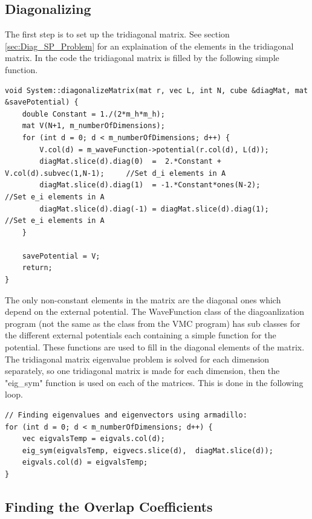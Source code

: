 \documentclass[../main.tex]{subfiles}
\begin{document}
\subsection{Diagonalizing}

The first step is to set up the tridiagonal matrix. See section \ref{sec:Diag_SP_Problem} for an explaination of the elements in the tridiagonal matrix. In the code the tridiagonal matrix is filled by the following simple function.
\lstset{language=c++}
\begin{lstlisting}[caption={}]
void System::diagonalizeMatrix(mat r, vec L, int N, cube &diagMat, mat &savePotential) {
    double Constant = 1./(2*m_h*m_h);
    mat V(N+1, m_numberOfDimensions);
    for (int d = 0; d < m_numberOfDimensions; d++) {
        V.col(d) = m_waveFunction->potential(r.col(d), L(d));
        diagMat.slice(d).diag(0)  =  2.*Constant + V.col(d).subvec(1,N-1);     //Set d_i elements in A
        diagMat.slice(d).diag(1)  = -1.*Constant*ones(N-2);               //Set e_i elements in A
        diagMat.slice(d).diag(-1) = diagMat.slice(d).diag(1);                         //Set e_i elements in A
    }

    savePotential = V;
    return;
}
\end{lstlisting}
The only non-constant elements in the matrix are the diagonal ones which depend on the external potential. The WaveFunction class of the diagoanlization program (not the same as the class from the VMC program) has sub classes for the different external potentials each containing a simple function for the potential. These functions are used to fill in the diagonal elements of the matrix. The tridiagonal matrix eigenvalue problem is solved for each dimension separately, so one tridiagonal matrix is made for each dimension, then the "eig\_sym" function is used on each of the matrices. This is done in the following loop.
\lstset{language=c++}
\begin{lstlisting}[caption={}]
// Finding eigenvalues and eigenvectors using armadillo:
for (int d = 0; d < m_numberOfDimensions; d++) {
    vec eigvalsTemp = eigvals.col(d);
    eig_sym(eigvalsTemp, eigvecs.slice(d),  diagMat.slice(d));
    eigvals.col(d) = eigvalsTemp;
}
\end{lstlisting}

\subsection{Finding the Overlap Coefficients}
\end{document}
